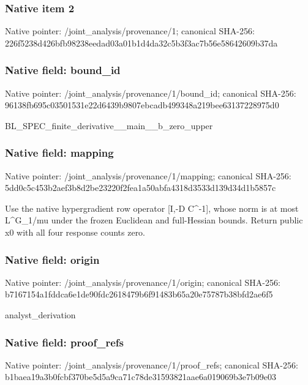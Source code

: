 \documentclass[10pt,a4paper]{article}
\begin{document}
\subsubsection{Native item 2}
Native pointer: /joint\_\allowbreak{}analysis/provenance/1; canonical SHA-256: 226f5238d426bfb98238eedad03a01b1d4da32c5b3f3ac7b56e58642609b37da

\subsubsection{Native field: bound\_\allowbreak{}id}
Native pointer: /joint\_\allowbreak{}analysis/provenance/1/bound\_\allowbreak{}id; canonical SHA-256: 96138fb695c03501531e22d6439b9807ebcadb499348a219bee63137228975d0

\begingroup\raggedright\sloppy BL\_\allowbreak{}SPEC\_\allowbreak{}finite\_\allowbreak{}derivative\_\allowbreak{}\_\allowbreak{}main\_\allowbreak{}\_\allowbreak{}b\_\allowbreak{}zero\_\allowbreak{}upper\par\endgroup

\subsubsection{Native field: mapping}
Native pointer: /joint\_\allowbreak{}analysis/provenance/1/mapping; canonical SHA-256: 5dd0c5c453b2aef3b8d2be23220f2fea1a50abfa4318d3533d139d34d1b5857c

\begingroup\raggedright\sloppy Use the native hypergradient row operator [I,\allowbreak{}-D C\textasciicircum{}-1],\allowbreak{} whose norm is at most L\textasciicircum{}G\_\allowbreak{}1/\allowbreak{}mu under the frozen Euclidean and full-Hessian bounds. Return public x0 with all four response counts zero.\par\endgroup

\subsubsection{Native field: origin}
Native pointer: /joint\_\allowbreak{}analysis/provenance/1/origin; canonical SHA-256: b7167154a1fddca6e1de90fdc2618479b6f91483b65a20e75787b38bfd2ae6f5

\begingroup\raggedright\sloppy analyst\_\allowbreak{}derivation\par\endgroup

\subsubsection{Native field: proof\_\allowbreak{}refs}
Native pointer: /joint\_\allowbreak{}analysis/provenance/1/proof\_\allowbreak{}refs; canonical SHA-256: b1baea19a3b0fcbf370be5d5a9ca71c78de31593821aae6a019069b3e7b09e03
\end{document}
